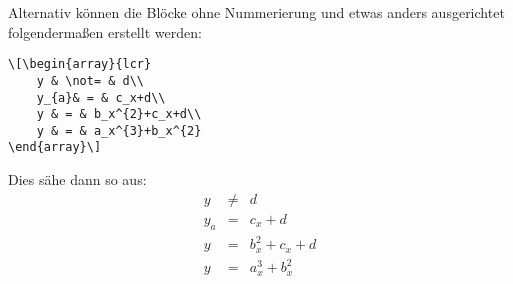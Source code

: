 Alternativ können die Blöcke ohne Nummerierung und etwas anders ausgerichtet folgendermaßen erstellt werden:
\begin{lstlisting}
\[\begin{array}{lcr}
    y & \not= & d\\
    y_{a}& = & c_x+d\\
    y & = & b_x^{2}+c_x+d\\
    y & = & a_x^{3}+b_x^{2}
\end{array}\]
\end{lstlisting}
Dies sähe dann so aus:
\[\begin{array}{lcr}
    y & \not= & d\\
    y_{a}& = & c_x+d\\
    y & = & b_x^{2}+c_x+d\\
    y & = & a_x^{3}+b_x^{2}
\end{array}\]